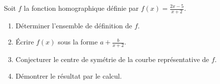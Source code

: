 
Soit $f$ la fonction homographique définie par $f(x)=\frac{2x-5}{x+2}$.
\begin{enumerate}
\item Déterminer l'ensemble de définition de $f$.
\item Écrire $f(x)$ sous la forme $a+\frac{b}{x+2}$.
\item Conjecturer le centre de symétrie de la courbe représentative de $f$.
\item Démontrer le résultat par le calcul.
\end{enumerate}